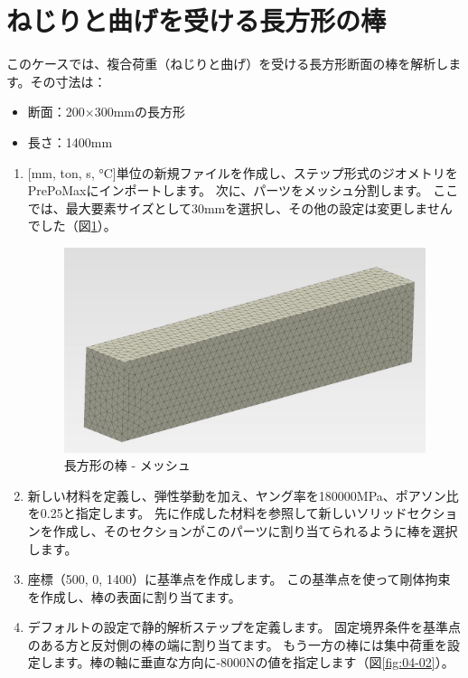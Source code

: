 \section{ねじりと曲げを受ける長方形の棒}
このケースでは、複合荷重（ねじりと曲げ）を受ける長方形断面の棒を解析します。その寸法は：
\begin{itemize}
\item 断面：200$\times$300mmの長方形
\item 長さ：1400mm
\end{itemize}
\begin{enumerate}
\item
  {[}mm, ton, s, °C{]}単位の新規ファイルを作成し、ステップ形式のジオメトリをPrePoMaxにインポートします。
  次に、パーツをメッシュ分割します。
  ここでは、最大要素サイズとして30mmを選択し、その他の設定は変更しませんでした（図\ref{fig:04-01}）。
	\begin{figure}[H]
	\centering
	\includegraphics[width=125mm]{fig/04-01.png}
	\caption{長方形の棒 - メッシュ}
	\label{fig:04-01}
	\end{figure}
\vspace{-\baselineskip}
\item
  新しい材料を定義し、弾性挙動を加え、ヤング率を180000MPa、ポアソン比を0.25と指定します。
  先に作成した材料を参照して新しいソリッドセクションを作成し、そのセクションがこのパーツに割り当てられるように棒を選択します。
\item
  座標（500, 0, 1400）に基準点を作成します。
  この基準点を使って剛体拘束を作成し、棒の表面に割り当てます。
\item
  デフォルトの設定で静的解析ステップを定義します。
  固定境界条件を基準点のある方と反対側の棒の端に割り当てます。
  もう一方の棒には集中荷重を設定します。棒の軸に垂直な方向に-8000Nの値を指定します（図\ref{fig:04-02}）。
	\begin{figure}[H]
	\centering

\end{figure}
\end{enumerate}
